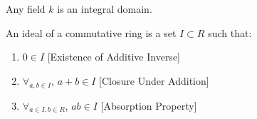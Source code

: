                 \begin{theorem}
                    Any field $k$ is an integral domain.
                \end{theorem}
                \begin{definition}
                    An ideal of a commutative ring is
                    a set $I\subset R$ such that:
                    \begin{enumerate}
                        \item $0\in I$
                              \hfill[Existence of Additive Inverse]
                        \item $\forall_{a,b\in I}$,
                              $a+b\in I$
                              \hfill[Closure Under Addition]
                        \item $\forall_{a\in I,b\in R}$,
                              $a b \in I$
                              \hfill[Absorption Property]
                    \end{enumerate}
                \end{definition}
